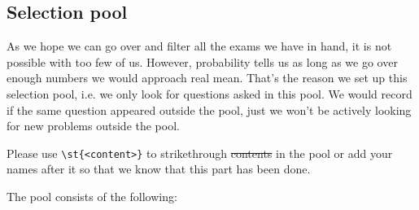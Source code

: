 \subsection*{Selection pool}

As we hope we can go over and filter all the exams we have in hand, it is not possible with too few of us.
However, probability tells us as long as we go over enough numbers we would approach real mean.
That's the reason we set up this selection pool, i.e. we only look for questions asked in this pool. 
We would record if the same question appeared outside the pool, just we won't be actively looking for new problems outside the pool.

Please use \lstinline|\st{<content>}| to strikethrough \st{contents} in the pool or add your names after it so that we know that this part has been done.

The pool consists of the following:

